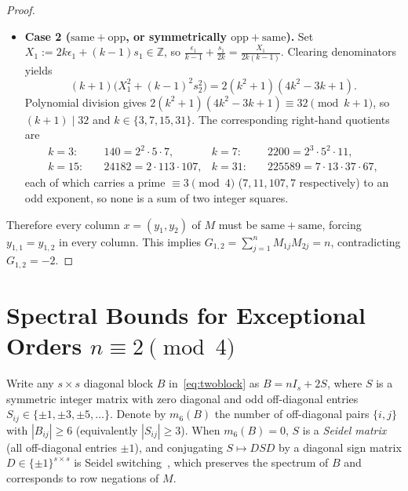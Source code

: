 \documentclass[11pt]{article}
\theoremstyle{remark}
\newcommand{\Z}{\mathbb{Z}}
\begin{document}
\begin{proof}
\begin{itemize}[leftmargin=*,topsep=3pt,itemsep=2pt]
\item \textbf{Case 2 ($\mathrm{same} + \mathrm{opp}$, or symmetrically $\mathrm{opp} + \mathrm{same}$).} Set $X_1 := 2k \epsilon_1 + (k - 1) s_1 \in \Z$, so $\frac{\epsilon_1}{k - 1} + \frac{s_1}{2k} = \frac{X_1}{2k(k - 1)}$. Clearing denominators yields
\[
  (k + 1)\bigl(X_1^2 + (k - 1)^2 s_2^2\bigr) = 2(k^2 + 1)(4k^2 - 3k + 1).
\]
Polynomial division gives $2(k^2 + 1)(4k^2 - 3k + 1) \equiv 32 \pmod{k + 1}$, so $(k + 1) \mid 32$ and $k \in \{3, 7, 15, 31\}$. The corresponding right-hand quotients are
\begin{align*}
  k = 3:  &\quad 140 = 2^2 \cdot 5 \cdot 7, &
  k = 7:  &\quad 2200 = 2^3 \cdot 5^2 \cdot 11, \\
  k = 15: &\quad 24182 = 2 \cdot 113 \cdot 107, &
  k = 31: &\quad 225589 = 7 \cdot 13 \cdot 37 \cdot 67,
\end{align*}
each of which carries a prime $\equiv 3 \pmod 4$ ($7, 11, 107, 7$ respectively) to an odd exponent, so none is a sum of two integer squares.
\end{itemize}

Therefore every column $x = (y_1, y_2)$ of $M$ must be $\mathrm{same} + \mathrm{same}$, forcing $y_{1,1} = y_{1,2}$ in every column. This implies $G_{1,2} = \sum_{j=1}^n M_{1j} M_{2j} = n$, contradicting $G_{1,2} = -2$.
\end{proof}

\section{Spectral Bounds for Exceptional Orders \texorpdfstring{$n \equiv 2 \pmod 4$}{n = 2 (mod 4)}}\label{sec:spectral}

Write any $s \times s$ diagonal block $B$ in~\eqref{eq:twoblock} as $B = n I_s + 2 S$, where $S$ is a symmetric integer matrix with zero diagonal and odd off-diagonal entries $S_{ij} \in \{\pm 1, \pm 3, \pm 5, \dots\}$. Denote by $m_6(B)$ the number of off-diagonal pairs $\{i, j\}$ with $|B_{ij}| \ge 6$ (equivalently $|S_{ij}| \ge 3$). When $m_6(B) = 0$, $S$ is a \emph{Seidel matrix} (all off-diagonal entries $\pm 1$), and conjugating $S \mapsto D S D$ by a diagonal sign matrix $D \in \{\pm 1\}^{s \times s}$ is Seidel switching~\cite{brouwer2012}, which preserves the spectrum of $B$ and corresponds to row negations of $M$.
\end{document}
